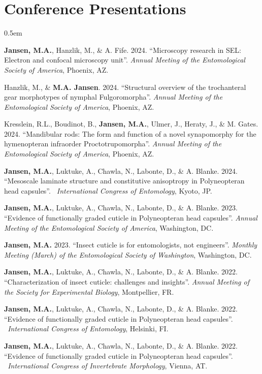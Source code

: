 \documentclass[12pt,a4paper]{article}
\begin{document}
\section*{Conference Presentations}
	\begin{description}
		\itemsep0.5em
		\item \textbf{Jansen, M.A.}, Hanzlik, M., \& A. Fife. 2024. ``Microscopy research in SEL: Electron and confocal microscopy unit''. \textit{Annual Meeting of the Entomological Society of America}, Phoenix, AZ.
		\item Hanzlik, M., \& \textbf{M.A. Jansen}. 2024. ``Structural overview of the trochanteral gear morphotypes of nymphal Fulgoromorpha''. \textit{Annual Meeting of the Entomological Society of America}, Phoenix, AZ.
		\item Kresslein, R.L., Boudinot, B., \textbf{Jansen, M.A.}, Ulmer, J., Heraty, J., \& M. Gates. 2024. ``Mandibular rods: The form and function of a novel synapomorphy for the hymenopteran infraorder Proctotrupomorpha''. \textit{Annual Meeting of the Entomological Society of America}, Phoenix, AZ.
		\item \textbf{Jansen, M.A.}, Luktuke, A., Chawla, N., Labonte, D., \& A. Blanke. 2024. ``Mesoscale laminate structure and constitutive anisoptropy in Polyneopteran head capsules''. \textit{~International Congress of Entomology}, Kyoto, JP.
		\item \textbf{Jansen, M.A.}, Luktuke, A., Chawla, N., Labonte, D., \& A. Blanke. 2023. ``Evidence of functionally graded cuticle in Polyneopteran head capsules''. \textit{Annual Meeting of the Entomological Society of America}, Washington, DC.
		\item \textbf{Jansen, M.A.} 2023. ``Insect cuticle is for entomologists, not engineers''. \textit{Monthly Meeting (March) of the Entomological Society of Washington}, Washington, DC.
		\item \textbf{Jansen, M.A.}, Luktuke, A., Chawla, N., Labonte, D., \& A. Blanke. 2022. ``Characterization of insect cuticle: challenges and insights''. \textit{Annual Meeting of the Society for Experimental Biology}, Montpellier, FR.
		\item \textbf{Jansen, M.A.}, Luktuke, A., Chawla, N., Labonte, D., \& A. Blanke. 2022. ``Evidence of functionally graded cuticle	in Polyneopteran head capsules''. \textit{~International Congress of Entomology}, Helsinki, FI.
		\item \textbf{Jansen, M.A.}, Luktuke, A., Chawla, N., Labonte, D., \& A. Blanke. 2022. ``Evidence of functionally graded cuticle	in Polyneopteran head capsules''. \textit{~International Congress of Invertebrate Morphology}, Vienna, AT.

\end{description}
\end{document}
